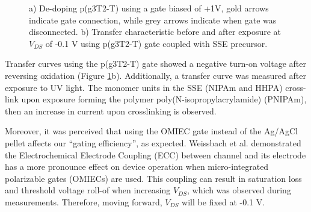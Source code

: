 \begin{figure}[ht]
    \centering
    \caption[Electrochemical de-doping of oxidized p(g3T2-T) OECT]{a) De-doping p(g3T2-T) using a gate biased of +1V, gold arrows indicate gate connection, while grey arrows indicate when gate was disconnected. b) Transfer characteristic before and after exposure at $V_{DS}$ of -0.1 V using p(g3T2-T) gate coupled with SSE precursor.}
    \label{fig:revox2}
\end{figure}

Transfer curves using the p(g3T2-T) gate showed a negative turn-on voltage after reversing oxidation (Figure \ref{fig:revox2}b). Additionally, a transfer curve was measured after exposure to UV light. The monomer units in the SSE (NIPAm and HHPA) cross-link upon exposure forming the polymer poly(N-isopropylacrylamide) (PNIPAm), then an increase in current upon crosslinking is observed.

Moreover, it was perceived that using the OMIEC gate instead of the Ag/AgCl pellet affects our ``gating efficiency'', as expected. Weissbach et al.  \cite{weissbachUnravelingElectrochemicalElectrode2023} demonstrated the Electrochemical Electrode Coupling (ECC) between channel and its electrode has a more pronounce effect on device operation when micro-integrated polarizable gates (OMIECs) are used. This coupling can result in saturation loss %
and threshold voltage roll-of when increasing $V_{DS}$, which was observed during measurements. Therefore, moving forward, $V_{DS}$ will be fixed at -0.1 V.

